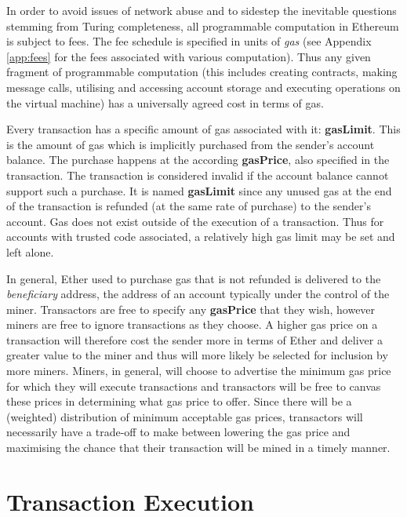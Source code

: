 \documentclass[9pt,oneside]{amsart}
\begin{document}
\begin{multicols}{2}
In order to avoid issues of network abuse and to sidestep the inevitable questions stemming from Turing completeness, all programmable computation in Ethereum is subject to fees. The fee schedule is specified in units of \textit{gas} (see Appendix \ref{app:fees} for the fees associated with various computation). Thus any given fragment of programmable computation (this includes creating contracts, making message calls, utilising and accessing account storage and executing operations on the virtual machine) has a universally agreed cost in terms of gas.

Every transaction has a specific amount of gas associated with it: \textbf{gasLimit}. This is the amount of gas which is implicitly purchased from the sender's account balance. The purchase happens at the according \textbf{gasPrice}, also specified in the transaction. The transaction is considered invalid if the account balance cannot support such a purchase. It is named \textbf{gasLimit} since any unused gas at the end of the transaction is refunded (at the same rate of purchase) to the sender's account. Gas does not exist outside of the execution of a transaction. Thus for accounts with trusted code associated, a relatively high gas limit may be set and left alone.

In general, Ether used to purchase gas that is not refunded is delivered to the \textit{beneficiary} address, the address of an account typically under the control of the miner. Transactors are free to specify any \textbf{gasPrice} that they wish, however miners are free to ignore transactions as they choose. A higher gas price on a transaction will therefore cost the sender more in terms of Ether and deliver a greater value to the miner and thus will more likely be selected for inclusion by more miners. Miners, in general, will choose to advertise the minimum gas price for which they will execute transactions and transactors will be free to canvas these prices in determining what gas price to offer. Since there will be a (weighted) distribution of minimum acceptable gas prices, transactors will necessarily have a trade-off to make between lowering the gas price and maximising the chance that their transaction will be mined in a timely manner.


\section{Transaction Execution} \label{ch:transactions}


\end{multicols}
\end{document}
